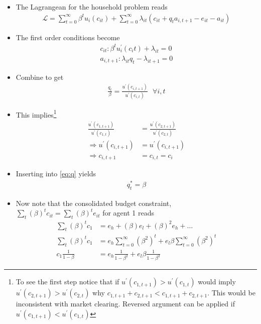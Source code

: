 \documentclass{scrartcl}
\begin{document}
\begin{itemize}
	\item The Lagrangean for the household problem reads
	\begin{align}
	\mathcal{L}=\sum_{t=0}^{\infty} \beta^t u_{i} (c_{it})+\sum_{t=0}^{\infty} \lambda_{it} \left( c_{it}+q_t a_{i,t+1}-e_{it}-a_{it}\right)
	\end{align}
	\item The first order conditions become
	\begin{align}
	c_{it}: \beta^t u^\prime_i(c_it)+\lambda_{it}=0 \\
	a_{i,t+1}: \lambda_{it} q_t - \lambda_{it+1}=0
	\end{align}
	\item Combine to get
	\begin{align}
	\frac{q_t}{\beta}=\frac{u^\prime(c_{i,t+1})}{u^\prime(c_{i,t})} \text{ } \forall i,t \label{eq:q}
	\end{align}
	\item This implies\footnote{To see the first step notice that if $u^\prime( c_{1,t+1})>u^\prime( c_{1,t})$ would imply $u^\prime( c_{2,t+1})>u^\prime( c_{2,t})$ why $c_{1,t+1}+c_{2,t+1}<c_{1,t+1}+c_{2,t+1}$. This would be inconsistent with market clearing. Reversed argument can be applied if $u^\prime( c_{1,t+1})<u^\prime( c_{1,t})$}
	\begin{align}
	\frac{u^\prime(c_{1,t+1})}{u^\prime(c_{1,t})}&=	\frac{u^\prime(c_{2,t+1})}{u^\prime(c_{2,t})} \\
	\Rightarrow u^\prime( c_{i,t+1})&=u^\prime( c_{i,t+1}) \\
	\Rightarrow c_{i,t+1}&=c_{i,t}=c_i
	\end{align}
	\item Inserting into \eqref{eq:q} yields 
	\begin{align}
	q_t^*=\beta
	\end{align}
	\item Now note that the consolidated budget constraint, $\sum_t \left( \beta \right)^t c_{it}=\sum_t \left( \beta \right)^t e_{it}$ for agent 1 reads
	\begin{align}
	\sum_t \left( \beta \right)^t c_{1}&=e_h+\left( \beta \right)e_l+\left( \beta \right)^2e_h+\dots \\
	\sum_t \left( \beta \right)^t c_{1}&=e_h\sum_{t=0}^{\infty} (\beta^2)^t+e_l \beta \sum_{t=0}^{\infty} (\beta^2)^t\\
	c_{1}\frac{1}{1-\beta}&=e_h\frac{1}{1-\beta^2}+e_l\beta\frac{1}{1-\beta^2}
	\end{align}

\end{itemize}
\end{document}
